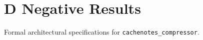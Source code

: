 \section{D Negative Results}

Formal architectural specifications for \texttt{cachenotes_compressor}.
